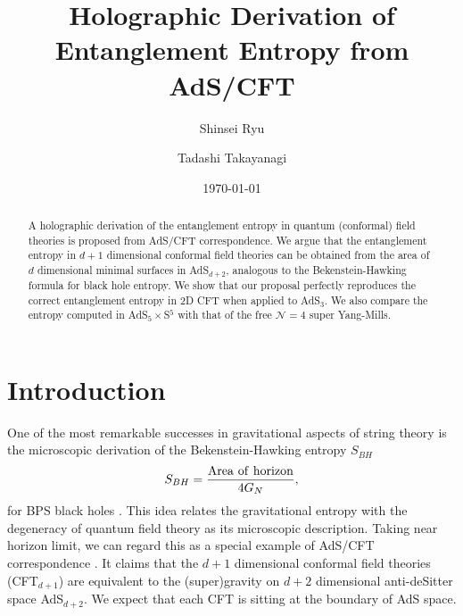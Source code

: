 \documentclass[twocolumn,amsmath,amssymb,nofootinbib,eqsecnum,tighten,prd]{revtex4}
\def\frac#1#2{{#1\over #2}}
\def\frac#1#2{{#1\over #2}}
\begin{document}
\title{Holographic Derivation of
Entanglement Entropy from AdS/CFT}

\author{Shinsei Ryu}
\author{Tadashi Takayanagi}
\date{\today}


\begin{abstract}
A holographic derivation of the entanglement entropy in quantum
(conformal) field theories is proposed from AdS/CFT correspondence.
We argue that the entanglement entropy in $d+1$ dimensional
conformal field theories can be obtained from the area of $d$
dimensional minimal surfaces in AdS$_{d+2}$, analogous to the
Bekenstein-Hawking formula for black hole entropy. We show that our
proposal perfectly reproduces the correct entanglement entropy in 2D
CFT when applied to AdS$_3$. We also compare the entropy computed in
AdS$_5\times$S$^5$ with that of the free ${\mathcal N}=4$ super
Yang-Mills.
\end{abstract}


\maketitle


\section{Introduction}
\setcounter{section}{1}

One of the most remarkable successes in gravitational aspects of
string theory is the microscopic derivation of the
Bekenstein-Hawking entropy $S_{BH}$
\begin{equation}
S_{BH}=\frac{{\rm Area~of~horizon}}{4G_N},
\label{BHentropy}
\end{equation}
for BPS black holes \cite{StVa}. This idea relates the gravitational
entropy with the degeneracy of quantum field theory as its
microscopic description. Taking near horizon limit, we can regard
this as a special example of AdS/CFT correspondence
\cite{Maldacena,ADSGKP,ADSWitten}. It claims that the $d+1$
dimensional conformal field theories (CFT$_{d+1}$) are equivalent to
the (super)gravity on $d+2$ dimensional anti-deSitter space
AdS$_{d+2}$. We expect that each CFT is sitting at the boundary of
AdS space.
\end{document}
